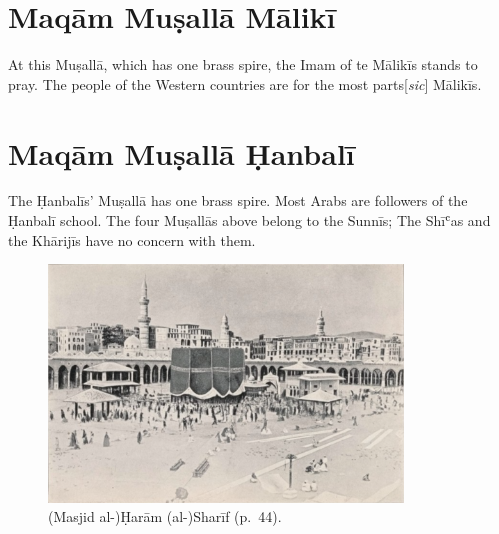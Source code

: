 \section*{Maqām Muṣallā Mālikī}

At this Muṣallā, which has one brass spire, the Imam of te Mālikīs stands to pray. The people of the Western countries are for the most parts[\textit{sic}] Mālikīs.

\section*{Maqām Muṣallā Ḥanbalī}

The Ḥanbalīs' Muṣallā has one brass spire. Most Arabs are followers of the Ḥanbalī school. The four Muṣallās above belong to the Sunnīs; The Shīʿas and the Khārijīs have no concern with them.

\begin{figure}[h]
  \begin{center}
    \includegraphics[width=0.84\textwidth]{images/haram1}
  \end{center}
  \caption*{(Masjid al-)Ḥarām (al-)Sharīf (p.\ 44).}
\end{figure}